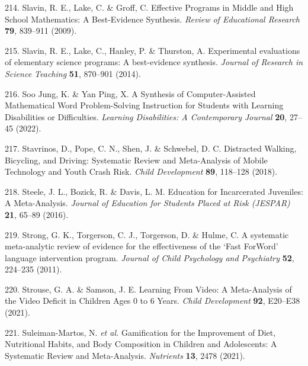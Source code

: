\documentclass[
  english,
  man]{apa6}
\newenvironment{cslreferences}%
  {}%
  {\par}
\begin{document}
\begin{cslreferences}
\leavevmode\hypertarget{ref-slavinEffectiveProgramsMiddle2009}{}%
214. Slavin, R. E., Lake, C. \& Groff, C. Effective Programs in Middle and High School Mathematics: A Best-Evidence Synthesis. \emph{Review of Educational Research} \textbf{79}, 839--911 (2009).

\leavevmode\hypertarget{ref-slavinExperimentalEvaluationsElementary2014}{}%
215. Slavin, R. E., Lake, C., Hanley, P. \& Thurston, A. Experimental evaluations of elementary science programs: A best-evidence synthesis. \emph{Journal of Research in Science Teaching} \textbf{51}, 870--901 (2014).

\leavevmode\hypertarget{ref-soojungSynthesisComputerAssistedMathematical2022}{}%
216. Soo Jung, K. \& Yan Ping, X. A Synthesis of Computer-Assisted Mathematical Word Problem-Solving Instruction for Students with Learning Disabilities or Difficulties. \emph{Learning Disabilities: A Contemporary Journal} \textbf{20}, 27--45 (2022).

\leavevmode\hypertarget{ref-stavrinosDistractedWalkingBicycling2018}{}%
217. Stavrinos, D., Pope, C. N., Shen, J. \& Schwebel, D. C. Distracted Walking, Bicycling, and Driving: Systematic Review and Meta-Analysis of Mobile Technology and Youth Crash Risk. \emph{Child Development} \textbf{89}, 118--128 (2018).

\leavevmode\hypertarget{ref-steeleEducationIncarceratedJuveniles2016}{}%
218. Steele, J. L., Bozick, R. \& Davis, L. M. Education for Incarcerated Juveniles: A Meta-Analysis. \emph{Journal of Education for Students Placed at Risk (JESPAR)} \textbf{21}, 65--89 (2016).

\leavevmode\hypertarget{ref-strongSystematicMetaanalyticReview2011}{}%
219. Strong, G. K., Torgerson, C. J., Torgerson, D. \& Hulme, C. A systematic meta-analytic review of evidence for the effectiveness of the `Fast ForWord' language intervention program. \emph{Journal of Child Psychology and Psychiatry} \textbf{52}, 224--235 (2011).

\leavevmode\hypertarget{ref-strouseLearningVideoMetaAnalysis2021}{}%
220. Strouse, G. A. \& Samson, J. E. Learning From Video: A Meta-Analysis of the Video Deficit in Children Ages 0 to 6 Years. \emph{Child Development} \textbf{92}, E20--E38 (2021).

\leavevmode\hypertarget{ref-suleiman-martosGamificationImprovementDiet2021}{}%
221. Suleiman-Martos, N. \emph{et al.} Gamification for the Improvement of Diet, Nutritional Habits, and Body Composition in Children and Adolescents: A Systematic Review and Meta-Analysis. \emph{Nutrients} \textbf{13}, 2478 (2021).


\end{cslreferences}
\end{document}
